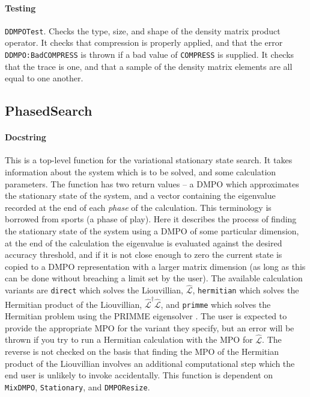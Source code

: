  \paragraph{Testing} \lstinline$DDMPOTest$. Checks the type, size, and shape of the density matrix product operator. It checks that compression is properly applied, and that the error \lstinline$DDMPO:BadCOMPRESS$ is thrown if a bad value of \lstinline$COMPRESS$ is supplied. It checks that the trace is one, and that a sample of the density matrix elements are all equal to one another. 
 
 \subsection{PhasedSearch}
 \paragraph{Docstring} This is a top-level function for the variational stationary state search. It takes information about the system which is to be solved, and some calculation parameters. The function has two return values -- a DMPO which approximates the stationary state of the system, and a vector containing the eigenvalue recorded at the end of each \emph{phase} of the calculation. This terminology is borrowed from sports (a phase of play). Here it describes the process of finding the stationary state of the system using a DMPO of some particular dimension, at the end of the calculation the eigenvalue is evaluated against the desired accuracy threshold, and if it is not close enough to zero the current state is copied to a DMPO representation with a larger matrix dimension (as long as this can be done without breaching a limit set by the user). The available calculation variants are \lstinline$direct$ which solves the Liouvillian, \(\hat{\mathcal{L}}\), \lstinline$hermitian$ which solves the Hermitian product of the Liouvillian, \(\hat{\mathcal{L}}^{\dagger}\hat{\mathcal{L}}\), and \lstinline$primme$ which solves the Hermitian problem using the PRIMME eigensolver \cite{SM10,WRS16}. The user is expected to provide the appropriate MPO for the variant they specify, but an error will be thrown if you try to run a Hermitian calculation with the MPO for \(\hat{\mathcal{L}}\). The reverse is not checked on the basis that finding the MPO of the Hermitian product of the Liouvillian involves an additional computational step which the end user is unlikely to invoke accidentally. This function is dependent on \lstinline$MixDMPO$, \lstinline$Stationary$, and \lstinline$DMPOResize$.
